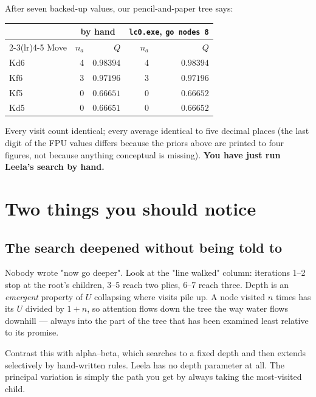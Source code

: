 \begin{realdata}[title={The check: hand arithmetic against the engine}]
After seven backed-up values, our pencil-and-paper tree says:
\begin{center}
\begin{tabular}{@{}lrrrr@{}}
\toprule
 & \multicolumn{2}{c}{by hand} & \multicolumn{2}{c}{\texttt{lc0.exe}, \texttt{go nodes 8}} \\
\cmidrule(lr){2-3}\cmidrule(lr){4-5}
Move & $n_a$ & $Q$ & $n_a$ & $Q$ \\
\midrule
Kd6 & 4 & $0.98394$ & 4 & $0.98394$ \\
Kf6 & 3 & $0.97196$ & 3 & $0.97196$ \\
Kf5 & 0 & $0.66651$ & 0 & $0.66652$ \\
Kd5 & 0 & $0.66651$ & 0 & $0.66652$ \\
\bottomrule
\end{tabular}
\end{center}
Every visit count identical; every average identical to five decimal places (the last digit
of the FPU values differs because the priors above are printed to four figures, not because
anything conceptual is missing). \textbf{You have just run Leela's search by hand.}
\end{realdata}

\section{Two things you should notice}

\subsection{The search deepened without being told to}

Nobody wrote "now go deeper". Look at the "line walked" column: iterations 1--2 stop at the
root's children, 3--5 reach two plies, 6--7 reach three. Depth is an \emph{emergent}
property of $U$ collapsing where visits pile up. A node visited $n$ times has its $U$ divided
by $1+n$, so attention flows down the tree the way water flows downhill --- always into the
part of the tree that has been examined least relative to its promise.

Contrast this with alpha--beta, which searches to a fixed depth and then extends
selectively by hand-written rules. Leela has no depth parameter at all. The principal
variation is simply the path you get by always taking the most-visited child.

